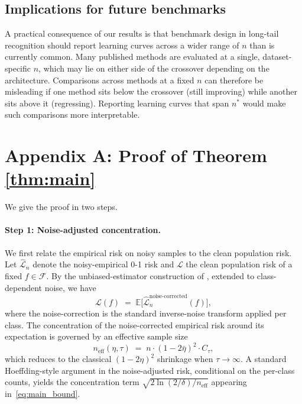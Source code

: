 \documentclass[11pt]{article}
\begin{document}
\subsection{Implications for future benchmarks}

A practical consequence of our results is that benchmark design in long-tail recognition should report learning curves across a wider range of $n$ than is currently common. Many published methods are evaluated at a single, dataset-specific $n$, which may lie on either side of the crossover depending on the architecture. Comparisons across methods at a fixed $n$ can therefore be misleading if one method sits below the crossover (still improving) while another sits above it (regressing). Reporting learning curves that span $n^{*}$ would make such comparisons more interpretable.

\appendix
\section{Appendix A: Proof of Theorem \ref{thm:main}} \label{app:proof}

We give the proof in two steps.

\paragraph{Step 1: Noise-adjusted concentration.} We first relate the empirical risk on noisy samples to the clean population risk. Let $\hat{\mathcal{L}}_n$ denote the noisy-empirical 0-1 risk and $\mathcal{L}$ the clean population risk of a fixed $f \in \mathcal{F}$. By the unbiased-estimator construction of \citet{natarajan2013}, extended to class-dependent noise, we have
\[
\mathcal{L}(f) \;=\; \mathbb{E}\bigl[\hat{\mathcal{L}}_n^{\mathrm{noise\text{-}corrected}}(f)\bigr],
\]
where the noise-correction is the standard inverse-noise transform applied per class. The concentration of the noise-corrected empirical risk around its expectation is governed by an effective sample size
\[
n_{\mathrm{eff}}(\eta, \tau) \;=\; n \cdot (1 - 2 \bar{\eta})^{2} \cdot C_{\tau},
\]
which reduces to the classical $(1 - 2\eta)^{2}$ shrinkage when $\tau \to \infty$. A standard Hoeffding-style argument in the noise-adjusted risk, conditional on the per-class counts, yields the concentration term $\sqrt{2 \ln(2/\delta) / n_{\mathrm{eff}}}$ appearing in~\eqref{eq:main_bound}.
\end{document}
